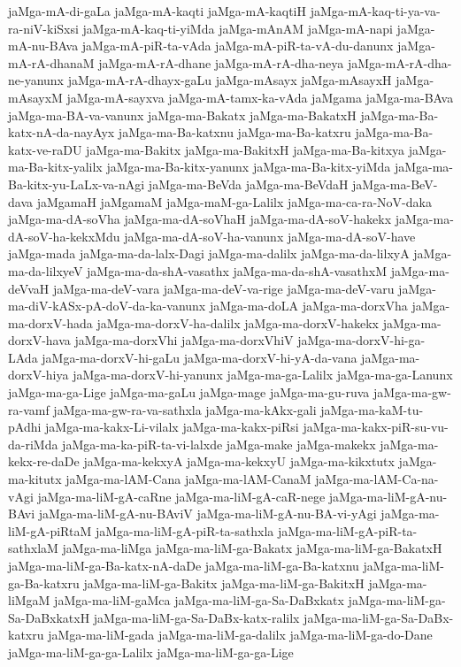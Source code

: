 {jaMga-mA-di-gaLa
jaMga-mA-kaqti
jaMga-mA-kaqtiH
jaMga-mA-kaq-ti-ya-va-ra-niV-kiSxsi
jaMga-mA-kaq-ti-yiMda
jaMga-mAnAM
jaMga-mA-napi
jaMga-mA-nu-BAva
jaMga-mA-piR-ta-vAda
jaMga-mA-piR-ta-vA-du-danunx
jaMga-mA-rA-dhanaM
jaMga-mA-rA-dhane
jaMga-mA-rA-dha-neya
jaMga-mA-rA-dha-ne-yanunx
jaMga-mA-rA-dhayx-gaLu
jaMga-mAsayx
jaMga-mAsayxH
jaMga-mAsayxM
jaMga-mA-sayxva
jaMga-mA-tamx-ka-vAda
jaMgama
jaMga-ma-BAva
jaMga-ma-BA-va-vanunx
jaMga-ma-Bakatx
jaMga-ma-BakatxH
jaMga-ma-Ba-katx-nA-da-nayAyx
jaMga-ma-Ba-katxnu
jaMga-ma-Ba-katxru
jaMga-ma-Ba-katx-ve-raDU
jaMga-ma-Bakitx
jaMga-ma-BakitxH
jaMga-ma-Ba-kitxya
jaMga-ma-Ba-kitx-yalilx
jaMga-ma-Ba-kitx-yanunx
jaMga-ma-Ba-kitx-yiMda
jaMga-ma-Ba-kitx-yu-LaLx-va-nAgi
jaMga-ma-BeVda
jaMga-ma-BeVdaH
jaMga-ma-BeV-dava
jaMgamaH
jaMgamaM
jaMga-maM-ga-Lalilx
jaMga-ma-ca-ra-NoV-daka
jaMga-ma-dA-soVha
jaMga-ma-dA-soVhaH
jaMga-ma-dA-soV-hakekx
jaMga-ma-dA-soV-ha-kekxMdu
jaMga-ma-dA-soV-ha-vanunx
jaMga-ma-dA-soV-have
jaMga-mada
jaMga-ma-da-lalx-Dagi
jaMga-ma-dalilx
jaMga-ma-da-lilxyA
jaMga-ma-da-lilxyeV
jaMga-ma-da-shA-vasathx
jaMga-ma-da-shA-vasathxM
jaMga-ma-deVvaH
jaMga-ma-deV-vara
jaMga-ma-deV-va-rige
jaMga-ma-deV-varu
jaMga-ma-diV-kASx-pA-doV-da-ka-vanunx
jaMga-ma-doLA
jaMga-ma-dorxVha
jaMga-ma-dorxV-hada
jaMga-ma-dorxV-ha-dalilx
jaMga-ma-dorxV-hakekx
jaMga-ma-dorxV-hava
jaMga-ma-dorxVhi
jaMga-ma-dorxVhiV
jaMga-ma-dorxV-hi-ga-LAda
jaMga-ma-dorxV-hi-gaLu
jaMga-ma-dorxV-hi-yA-da-vana
jaMga-ma-dorxV-hiya
jaMga-ma-dorxV-hi-yanunx
jaMga-ma-ga-Lalilx
jaMga-ma-ga-Lanunx
jaMga-ma-ga-Lige
jaMga-ma-gaLu
jaMga-mage
jaMga-ma-gu-ruva
jaMga-ma-gw-ra-vamf
jaMga-ma-gw-ra-va-sathxla
jaMga-ma-kAkx-gali
jaMga-ma-kaM-tu-pAdhi
jaMga-ma-kakx-Li-vilalx
jaMga-ma-kakx-piRsi
jaMga-ma-kakx-piR-su-vu-da-riMda
jaMga-ma-ka-piR-ta-vi-lalxde
jaMga-make
jaMga-makekx
jaMga-ma-kekx-re-daDe
jaMga-ma-kekxyA
jaMga-ma-kekxyU
jaMga-ma-kikxtutx
jaMga-ma-kitutx
jaMga-ma-lAM-Cana
jaMga-ma-lAM-CanaM
jaMga-ma-lAM-Ca-na-vAgi
jaMga-ma-liM-gA-caRne
jaMga-ma-liM-gA-caR-nege
jaMga-ma-liM-gA-nu-BAvi
jaMga-ma-liM-gA-nu-BAviV
jaMga-ma-liM-gA-nu-BA-vi-yAgi
jaMga-ma-liM-gA-piRtaM
jaMga-ma-liM-gA-piR-ta-sathxla
jaMga-ma-liM-gA-piR-ta-sathxlaM
jaMga-ma-liMga
jaMga-ma-liM-ga-Bakatx
jaMga-ma-liM-ga-BakatxH
jaMga-ma-liM-ga-Ba-katx-nA-daDe
jaMga-ma-liM-ga-Ba-katxnu
jaMga-ma-liM-ga-Ba-katxru
jaMga-ma-liM-ga-Bakitx
jaMga-ma-liM-ga-BakitxH
jaMga-ma-liMgaM
jaMga-ma-liM-gaMca
jaMga-ma-liM-ga-Sa-DaBxkatx
jaMga-ma-liM-ga-Sa-DaBxkatxH
jaMga-ma-liM-ga-Sa-DaBx-katx-ralilx
jaMga-ma-liM-ga-Sa-DaBx-katxru
jaMga-ma-liM-gada
jaMga-ma-liM-ga-dalilx
jaMga-ma-liM-ga-do-Dane
jaMga-ma-liM-ga-ga-Lalilx
jaMga-ma-liM-ga-ga-Lige
}
